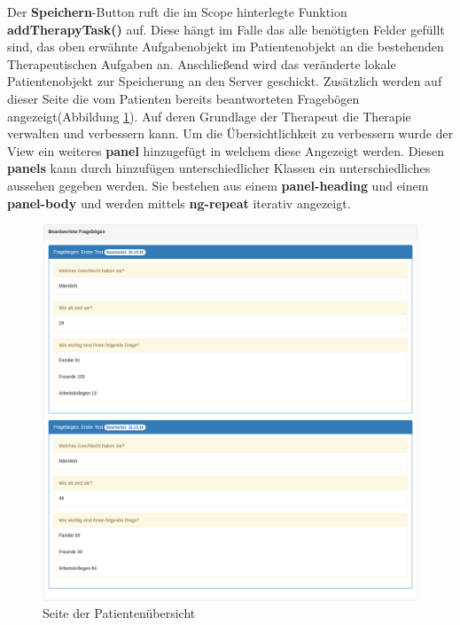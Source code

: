 Der \textbf{Speichern}-Button ruft die im Scope hinterlegte Funktion \textbf{addTherapyTask()} auf. Diese hängt im Falle das alle benötigten Felder gefüllt sind, das oben erwähnte Aufgabenobjekt im Patientenobjekt an die bestehenden Therapeutischen Aufgaben an. Anschließend wird das veränderte lokale Patientenobjekt zur Speicherung an den Server geschickt.
Zusätzlich werden auf dieser Seite die vom Patienten bereits beantworteten Fragebögen angezeigt(Abbildung \ref{PatientDetailsFrageboegen}). Auf deren Grundlage der Therapeut die Therapie verwalten und verbessern kann. Um die Übersichtlichkeit zu verbessern wurde der View ein weiteres \textbf{panel} hinzugefügt in welchem diese Angezeigt werden. Diesen \textbf{panels} kann durch hinzufügen unterschiedlicher Klassen ein unterschiedliches aussehen gegeben werden. Sie bestehen aus einem \textbf{panel-heading} und einem \textbf{panel-body} und werden mittels \textbf{ng-repeat} iterativ angezeigt. 

\begin{figure}[H]
	\centering
	\includegraphics[scale=0.3]{images/Screenshots/PatientDetailsFrageboegen}
	\caption[Seite der Patientenübersicht]{Seite der Patientenübersicht}
	\label{PatientDetailsFrageboegen}
\end{figure}



